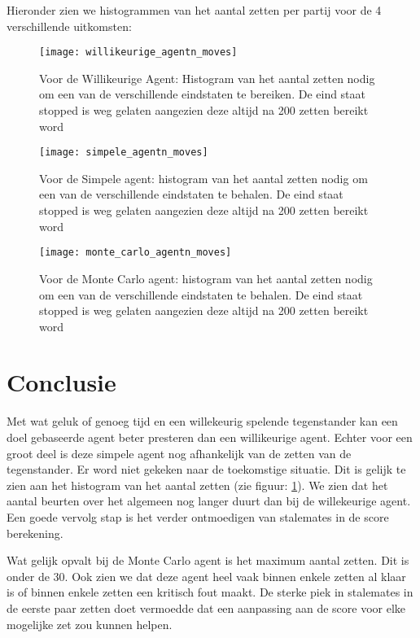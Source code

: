 \documentclass[10pt]{article}
\begin{document}
Hieronder zien we histogrammen van het aantal zetten per partij voor de 4 verschillende uitkomsten:

\begin{figure}[!htbp]
\begin{center}
\texttt{[image: willikeurige\_agentn\_moves]}
\end{center}
\caption{Voor de Willikeurige Agent: Histogram van het aantal zetten nodig om een van de verschillende eindstaten te bereiken. De eind staat stopped is weg gelaten aangezien deze altijd na 200 zetten bereikt word}
\end{figure}

\begin{figure}[!htbp]
\begin{center}
\texttt{[image: simpele\_agentn\_moves]}
\end{center}
\caption{Voor de Simpele agent: histogram van het aantal zetten nodig om een van de verschillende eindstaten te behalen. De eind staat stopped is weg gelaten aangezien deze altijd na 200 zetten bereikt word}
\label{hist_simple}
\end{figure}

\begin{figure}[!htbp]
\begin{center}
\texttt{[image: monte\_carlo\_agentn\_moves]}
\end{center}
\caption{Voor de Monte Carlo agent: histogram van het aantal zetten nodig om een van de verschillende eindstaten te behalen. De eind staat stopped is weg gelaten aangezien deze altijd na 200 zetten bereikt word}
\end{figure}

\section{Conclusie}

Met wat geluk of genoeg tijd en een willekeurig spelende tegenstander kan een doel gebaseerde agent beter presteren dan een willikeurige agent. Echter voor een groot deel is deze simpele agent nog afhankelijk van de zetten van de tegenstander. Er word niet gekeken naar de toekomstige situatie. Dit is gelijk te zien aan het histogram van het aantal zetten (zie figuur: \ref{hist_simple}). We zien dat het aantal beurten over het algemeen nog langer duurt dan bij de willekeurige agent. Een goede vervolg stap is het verder ontmoedigen van stalemates in de score berekening.

Wat gelijk opvalt bij de Monte Carlo agent is het maximum aantal zetten. Dit is onder de 30. Ook zien we dat deze agent heel vaak binnen enkele zetten al klaar is of binnen enkele zetten een kritisch fout maakt. De sterke piek in stalemates in de eerste paar zetten doet vermoedde dat een aanpassing aan de score voor elke mogelijke zet zou kunnen helpen.
\end{document}
